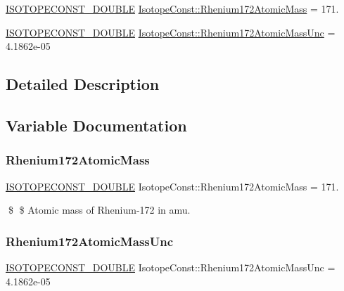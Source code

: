 \begin{DoxyCompactItemize}
\item 
\mbox{\hyperlink{group___isotope_const-_macros_ga8f45a7272ce02c0b4c65c44636ed719a}{I\+S\+O\+T\+O\+P\+E\+C\+O\+N\+S\+T\+\_\+\+D\+O\+U\+B\+LE}} \mbox{\hyperlink{group___isotope_const-_rhenium-_re172_ga69fb0c00761fd8e5331bfecb914f8482}{Isotope\+Const\+::\+Rhenium172\+Atomic\+Mass}} = 171.
\item 
\mbox{\hyperlink{group___isotope_const-_macros_ga8f45a7272ce02c0b4c65c44636ed719a}{I\+S\+O\+T\+O\+P\+E\+C\+O\+N\+S\+T\+\_\+\+D\+O\+U\+B\+LE}} \mbox{\hyperlink{group___isotope_const-_rhenium-_re172_gac52b03fce750012b30926bff8af16cf3}{Isotope\+Const\+::\+Rhenium172\+Atomic\+Mass\+Unc}} = 4.\+1862e-\/05
\end{DoxyCompactItemize}


\subsection{Detailed Description}


\subsection{Variable Documentation}
\mbox{\label{group___isotope_const-_rhenium-_re172_ga69fb0c00761fd8e5331bfecb914f8482}} 
\subsubsection{\texorpdfstring{Rhenium172\+Atomic\+Mass}{Rhenium172AtomicMass}}
{\footnotesize\ttfamily \mbox{\hyperlink{group___isotope_const-_macros_ga8f45a7272ce02c0b4c65c44636ed719a}{I\+S\+O\+T\+O\+P\+E\+C\+O\+N\+S\+T\+\_\+\+D\+O\+U\+B\+LE}} Isotope\+Const\+::\+Rhenium172\+Atomic\+Mass = 171.}

\$ \$ Atomic mass of Rhenium-\/172 in amu. \mbox{\label{group___isotope_const-_rhenium-_re172_gac52b03fce750012b30926bff8af16cf3}} 
\subsubsection{\texorpdfstring{Rhenium172\+Atomic\+Mass\+Unc}{Rhenium172AtomicMassUnc}}
{\footnotesize\ttfamily \mbox{\hyperlink{group___isotope_const-_macros_ga8f45a7272ce02c0b4c65c44636ed719a}{I\+S\+O\+T\+O\+P\+E\+C\+O\+N\+S\+T\+\_\+\+D\+O\+U\+B\+LE}} Isotope\+Const\+::\+Rhenium172\+Atomic\+Mass\+Unc = 4.\+1862e-\/05}

